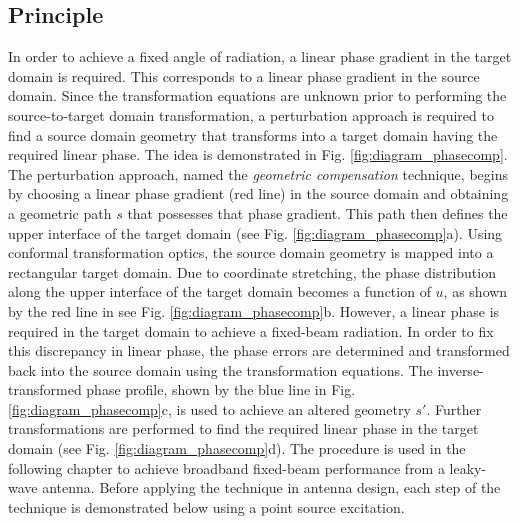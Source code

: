 \subsection{Principle}

In order to achieve a fixed angle of radiation, a linear phase gradient in the target domain is required. This corresponds to a linear phase gradient in the source domain. Since the transformation equations are unknown prior to performing the source-to-target domain transformation, a perturbation approach is required to find a source domain geometry that transforms into a target domain having the required linear phase. The idea is demonstrated in Fig. \ref{fig:diagram_phasecomp}. The perturbation approach, named the \textit{geometric compensation} technique, begins by choosing a linear phase gradient (red line) in the source domain and obtaining a geometric path $s$ that possesses that phase gradient. This path then defines the upper interface of the target domain (see Fig. \ref{fig:diagram_phasecomp}a). Using conformal transformation optics, the source domain geometry is mapped into a rectangular target domain. Due to coordinate stretching, the phase distribution along the upper interface of the target domain becomes a function of $u$, as shown by the red line in see Fig. \ref{fig:diagram_phasecomp}b. However, a linear phase is required in the target domain to achieve a fixed-beam radiation. In order to fix this discrepancy in linear phase, the phase errors are determined and transformed back into the source domain using the transformation equations. The inverse-transformed phase profile, shown by the blue line in Fig. \ref{fig:diagram_phasecomp}c, is used to achieve an altered geometry $s'$. Further transformations are performed to find the required linear phase in the target domain (see Fig. \ref{fig:diagram_phasecomp}d). The procedure is used in the following chapter to achieve broadband fixed-beam performance from a leaky-wave antenna. Before applying the technique in antenna design, each step of the technique is demonstrated below using a point source excitation. 
